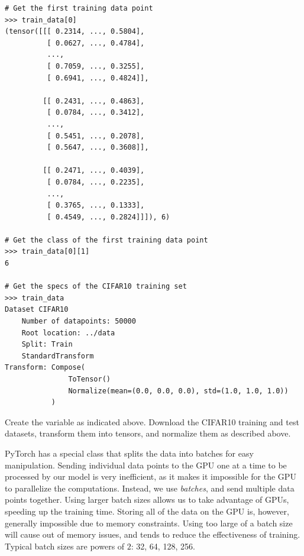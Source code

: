\begin{lstlisting}
# Get the first training data point
>>> train_data[0]
(tensor([[[ 0.2314, ..., 0.5804],
          [ 0.0627, ..., 0.4784],
          ...,
          [ 0.7059, ..., 0.3255],
          [ 0.6941, ..., 0.4824]],

         [[ 0.2431, ..., 0.4863],
          [ 0.0784, ..., 0.3412],
          ...,
          [ 0.5451, ..., 0.2078],
          [ 0.5647, ..., 0.3608]],

         [[ 0.2471, ..., 0.4039],
          [ 0.0784, ..., 0.2235],
          ...,
          [ 0.3765, ..., 0.1333],
          [ 0.4549, ..., 0.2824]]]), 6)

# Get the class of the first training data point
>>> train_data[0][1]
6

# Get the specs of the CIFAR10 training set
>>> train_data
Dataset CIFAR10
    Number of datapoints: 50000
    Root location: ../data
    Split: Train
    StandardTransform
Transform: Compose(
               ToTensor()
               Normalize(mean=(0.0, 0.0, 0.0), std=(1.0, 1.0, 1.0))
           )
\end{lstlisting}

\begin{problem}
Create the  variable as indicated above.
Download the CIFAR10 training and test datasets, transform them into tensors, and normalize them as described above.
\end{problem}

PyTorch has a special class  that splits the data into batches for easy manipulation.
Sending individual data points to the GPU one at a time to be processed by our model is very inefficient, as it makes it impossible for the GPU to parallelize the computations.
Instead, we use \emph{batches}, and send multiple data points together.
Using larger batch sizes allows us to take advantage of GPUs, speeding up the training time.
Storing all of the data on the GPU is, however, generally impossible due to memory constraints.
Using too large of a batch size will cause out of memory issues, and tends to reduce the effectiveness of training.
Typical batch sizes are powers of $2$: 32, 64, 128, 256.

